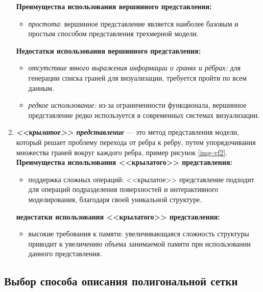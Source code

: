 \begin{enumerate}
	\textbf{Преимущества использования вершинного представления:}
	
	\begin{itemize}
		\item \textit{простота}: вершинное представление является наиболее базовым и простым способом представления трехмерной модели.
	\end{itemize}

	\textbf{Недостатки использования вершинного представления:}

	\begin{itemize}
		\item \textit{отсутствие явного выражения информации о гранях и рёбрах: }для генерации списка граней для визуализации, требуется пройти по всем данным.
		\item \textit{редкое использование: }из-за ограниченности функционала, вершинное представление редко используется в современных системах визуализации.
	\end{itemize}
	
	
	\item \textit{\textbf{<<крылатое>> представление}} --- это метод представления модели, который решает проблему перехода от ребра к ребру, путем упорядочивания множества граней вокруг каждого ребра, пример рисунок \ref{img-vf2}.
	\textbf{Преимущества использования <<крылатого>> представления:}

	\begin{itemize}
		\item поддержка сложных операций: <<крылатое>> представление подходит для операций подразделения поверхностей и интерактивного моделирования, благодаря своей уникальной структуре.
		\end{itemize}

	\textbf{недостатки использования <<крылатого>> представления:}

	\begin{itemize}
		\item высокие требования к памяти: увеличивающаяся сложность структуры приводит к увеличению объема занимаемой памяти при использовании данного представления.
	\end{itemize}
	
\end{enumerate}


\subsection{Выбор способа описания полигональной сетки} %

